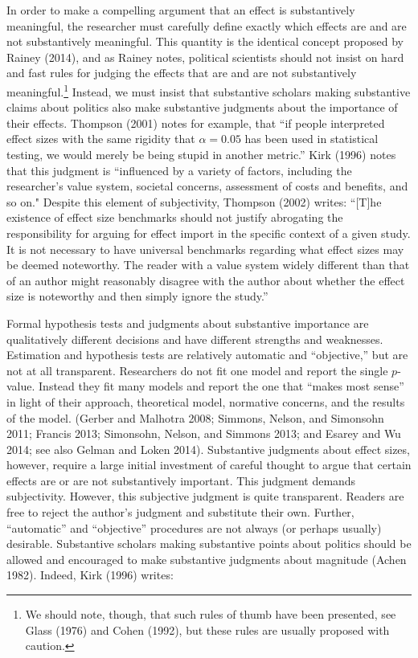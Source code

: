 \documentclass[12pt]{article}
\begin{document}
In order to make a compelling argument that an effect is substantively meaningful, the researcher must carefully define exactly which effects are and are not substantively meaningful. This quantity is the identical concept proposed by Rainey (2014), and as Rainey notes, political scientists should not insist on hard and fast rules for judging the effects that are and are not substantively meaningful.\footnote{We should note, though, that such rules of thumb have been presented, see Glass (1976) and Cohen (1992), but these rules are usually proposed with caution.} Instead, we must insist that substantive scholars making substantive claims about politics also make substantive judgments about the importance of their effects. Thompson (2001) notes for example, that ``if people interpreted effect sizes with the same rigidity that $\alpha = 0.05$ has been used in statistical testing, we would merely be being stupid in another metric.'' Kirk (1996) notes that this judgment is ``influenced by a variety of factors, including the researcher's value system, societal concerns, assessment of costs and benefits, and so on." Despite this element of subjectivity, Thompson (2002) writes: ``[T]he existence of effect size benchmarks should not justify abrogating the responsibility for arguing for effect import in the specific context of a given study. It is not necessary to have universal benchmarks regarding what effect sizes may be deemed noteworthy. The reader with a value system widely different than that of an author might reasonably disagree with the author about whether the effect size is noteworthy and then simply ignore the study.'' 

Formal hypothesis tests and judgments about substantive importance are qualitatively different decisions and have different strengths and weaknesses. Estimation and hypothesis tests are relatively automatic and ``objective,'' but are not at all transparent. Researchers do not fit one model and report the single $p$-value. Instead they fit many models and report the one that ``makes most sense'' in light of their approach, theoretical model, normative concerns, and the results of the model. (Gerber and Malhotra 2008; Simmons, Nelson, and Simonsohn 2011; Francis 2013; Simonsohn, Nelson, and Simmons 2013; and Esarey and Wu 2014; see also Gelman and Loken 2014). Substantive judgments about effect sizes, however, require a large initial investment of careful thought to argue that certain effects are or are not substantively important. This judgment demands subjectivity. However, this subjective judgment is quite transparent. Readers are free to reject the author's judgment and substitute their own. Further, ``automatic'' and ``objective'' procedures are not always (or perhaps usually) desirable. Substantive scholars making substantive points about politics should be allowed and encouraged to make substantive judgments about magnitude (Achen 1982). Indeed, Kirk (1996) writes:
\end{document}
